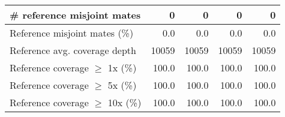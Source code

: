 \documentclass[12pt,a4paper]{article}
\begin{document}
\begin{table}[ht]
\begin{center}
\begin{tabular}{|l*{4}{|r}|}
\# reference misjoint mates & 0 & 0 & 0 & 0 \\ \hline
Reference misjoint mates (\%) & 0.0 & 0.0 & 0.0 & 0.0 \\ \hline
Reference avg. coverage depth & 10059 & 10059 & 10059 & 10059 \\ \hline
Reference coverage $\geq$ 1x (\%) & 100.0 & 100.0 & 100.0 & 100.0 \\ \hline
Reference coverage $\geq$ 5x (\%) & 100.0 & 100.0 & 100.0 & 100.0 \\ \hline
Reference coverage $\geq$ 10x (\%) & 100.0 & 100.0 & 100.0 & 100.0 \\ \hline
\end{tabular}
\end{center}
\end{table}
\end{document}

